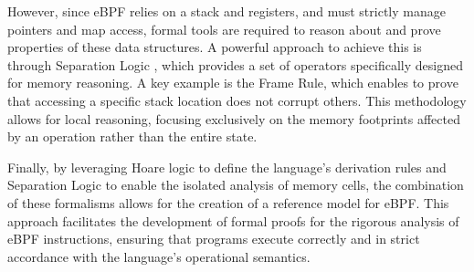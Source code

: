 \documentclass[sigconf]{acmart}
\begin{document}
However, since eBPF relies on a stack and registers, and must strictly manage pointers and map access, formal tools are required to reason about and prove properties of these data structures. A powerful approach to achieve this is through Separation Logic \cite{pym2019separation} \cite{o2001local}, which provides a set of operators specifically designed for memory reasoning. A key example is the Frame Rule, which enables to prove that accessing a specific stack location does not corrupt others. This methodology allows for local reasoning, focusing exclusively on the memory footprints affected by an operation rather than the entire state.


Finally, by leveraging Hoare logic to define the language's derivation rules and Separation Logic to enable the isolated analysis of memory cells, the combination of these formalisms allows for the creation of a reference model for eBPF. This approach facilitates the development of formal proofs for the rigorous analysis of eBPF instructions, ensuring that programs execute correctly and in strict accordance with the language's operational semantics.





\end{document}
